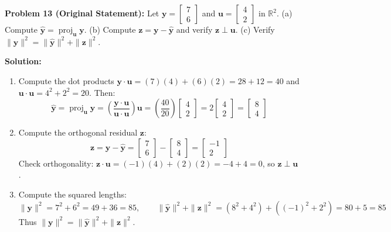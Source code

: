 \documentclass[11pt, letterpaper]{article}
\theoremstyle{definition}
\theoremstyle{remark}
\begin{document}
\textbf{Problem 13 (Original Statement):} Let $\mathbf{y} = \begin{bmatrix} 7 \\ 6 \end{bmatrix}$ and $\mathbf{u} = \begin{bmatrix} 4 \\ 2 \end{bmatrix}$ in $\mathbb{R}^2$. (a) Compute $\hat{\mathbf{y}} = \operatorname{proj}_{\mathbf{u}}\mathbf{y}$. (b) Compute $\mathbf{z} = \mathbf{y} - \hat{\mathbf{y}}$ and verify $\mathbf{z} \perp \mathbf{u}$. (c) Verify $\|\mathbf{y}\|^2 = \|\hat{\mathbf{y}}\|^2 + \|\mathbf{z}\|^2$.

\textbf{Solution:}
\begin{enumerate}[label=(\alph*)]
    \item Compute the dot products $\mathbf{y} \cdot \mathbf{u} = (7)(4) + (6)(2) = 28 + 12 = 40$ and $\mathbf{u} \cdot \mathbf{u} = 4^2 + 2^2 = 20$. Then:
    \[
    \hat{\mathbf{y}} = \operatorname{proj}_{\mathbf{u}}\mathbf{y} = \left(\frac{\mathbf{y} \cdot \mathbf{u}}{\mathbf{u} \cdot \mathbf{u}}\right)\mathbf{u} = \left(\frac{40}{20}\right)\begin{bmatrix} 4 \\ 2 \end{bmatrix} = 2\begin{bmatrix} 4 \\ 2 \end{bmatrix} = \begin{bmatrix} 8 \\ 4 \end{bmatrix}
    \]
    \item Compute the orthogonal residual $\mathbf{z}$:
    \[
    \mathbf{z} = \mathbf{y} - \hat{\mathbf{y}} = \begin{bmatrix} 7 \\ 6 \end{bmatrix} - \begin{bmatrix} 8 \\ 4 \end{bmatrix} = \begin{bmatrix} -1 \\ 2 \end{bmatrix}
    \]
    Check orthogonality: $\mathbf{z} \cdot \mathbf{u} = (-1)(4) + (2)(2) = -4 + 4 = 0$, so $\mathbf{z} \perp \mathbf{u}$.
    \item Compute the squared lengths:
    \[
    \|\mathbf{y}\|^2 = 7^2 + 6^2 = 49 + 36 = 85, \qquad \|\hat{\mathbf{y}}\|^2 + \|\mathbf{z}\|^2 = (8^2 + 4^2) + ((-1)^2 + 2^2) = 80 + 5 = 85
    \]
    Thus $\|\mathbf{y}\|^2 = \|\hat{\mathbf{y}}\|^2 + \|\mathbf{z}\|^2$.
\end{enumerate}
\end{document}
